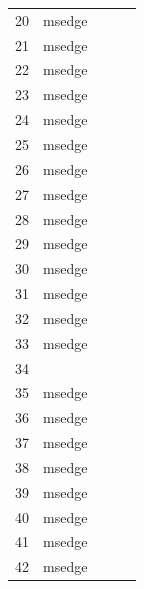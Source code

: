 \documentclass[a4paper,twoside,12pt]{book}
\begin{document}
\begin{appendices}
\begin{table}
\begin{tabular}{lllll}
	20  &         msedge &                &                &                \\
	21  &         msedge &                &                &                \\
	22  &         msedge &                &                &                \\
	23  &         msedge &                &                &                \\
	24  &         msedge &                &                &                \\
	25  &         msedge &                &                &                \\
	26  &         msedge &                &                &                \\
	27  &         msedge &                &                &                \\
	28  &         msedge &                &                &                \\
	29  &         msedge &                &                &                \\
	30  &         msedge &                &                &                \\
	31  &         msedge &                &                &                \\
	32  &         msedge &                &                &                \\
	33  &         msedge &                &                &                \\
	34  &                &                &                &                \\
	35  &         msedge &                &                &                \\
	36  &         msedge &                &                &                \\
	37  &         msedge &                &                &                \\
	38  &         msedge &                &                &                \\
	39  &         msedge &                &                &                \\
	40  &         msedge &                &                &                \\
	41  &         msedge &                &                &                \\
	42  &         msedge &                &                &                \\

\end{tabular}
\end{table}
\end{appendices}
\end{document}

